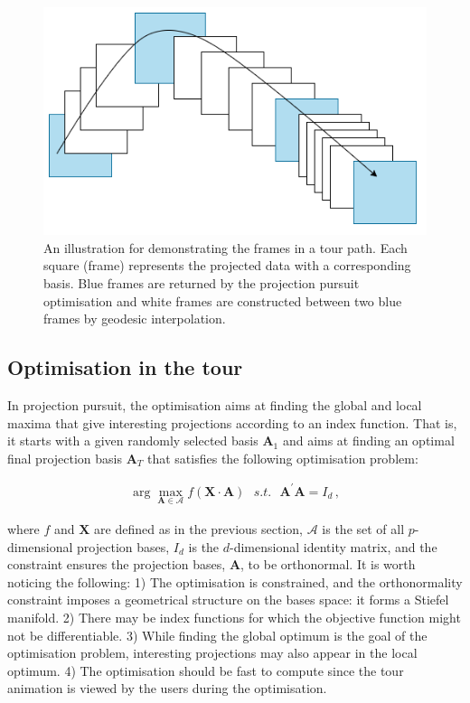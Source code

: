 \begin{Schunk}
\begin{figure}

{\centering \includegraphics[width=1\linewidth]{figs/tour-path} 

}

\caption[An illustration for demonstrating the frames in a tour path]{An illustration for demonstrating the frames in a tour path. Each square (frame) represents the projected data with a corresponding basis. Blue frames are returned by the projection pursuit optimisation and white frames are constructed between two blue frames by geodesic interpolation.}\label{fig:tour-path}
\end{figure}
\end{Schunk}

\hypertarget{tour-optim}{%
\subsection{Optimisation in the tour}\label{tour-optim}}

In projection pursuit, the optimisation aims at finding the global and
local maxima that give interesting projections according to an index
function. That is, it starts with a given randomly selected basis
\(\mathbf{A}_1\) and aims at finding an optimal final projection basis
\(\mathbf{A}_T\) that satisfies the following optimisation problem:

\begin{align}
\arg \max_{\mathbf{A} \in \mathcal{A}} f(\mathbf{X} \cdot \mathbf{A})  ~~~ s.t. ~~~ \mathbf{A}^{\prime} \mathbf{A} = I_d \,,
\end{align}

\noindent where \(f\) and \(\mathbf{X}\) are defined as in the previous
section, \(\mathcal{A}\) is the set of all \(p\)-dimensional projection
bases, \(I_d\) is the \(d\)-dimensional identity matrix, and the
constraint ensures the projection bases, \(\mathbf{A}\), to be
orthonormal. It is worth noticing the following: 1) The optimisation is
constrained, and the orthonormality constraint imposes a geometrical
structure on the bases space: it forms a Stiefel manifold. 2) There may
be index functions for which the objective function might not be
differentiable. 3) While finding the global optimum is the goal of the
optimisation problem, interesting projections may also appear in the
local optimum. 4) The optimisation should be fast to compute since the
tour animation is viewed by the users during the optimisation.

